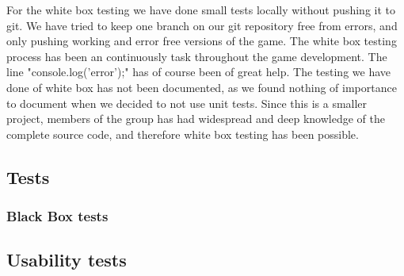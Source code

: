 For the white box testing we have done small tests locally without pushing it to git. We have tried to keep one branch on our git repository free from errors, and only pushing working and error free versions of the game. The white box testing process has been an continuously task throughout the game development. The line "console.log('error');" has of course been of great help. The testing we have done of white box  has not been documented, as we found nothing of importance to document when we decided to not use unit tests. Since this is a smaller project, members of the group has had widespread and deep knowledge of the complete source code, and therefore white box testing has been possible.


\subsection{Tests}


\subsubsection{Black Box tests}


\subsection{Usability tests}


